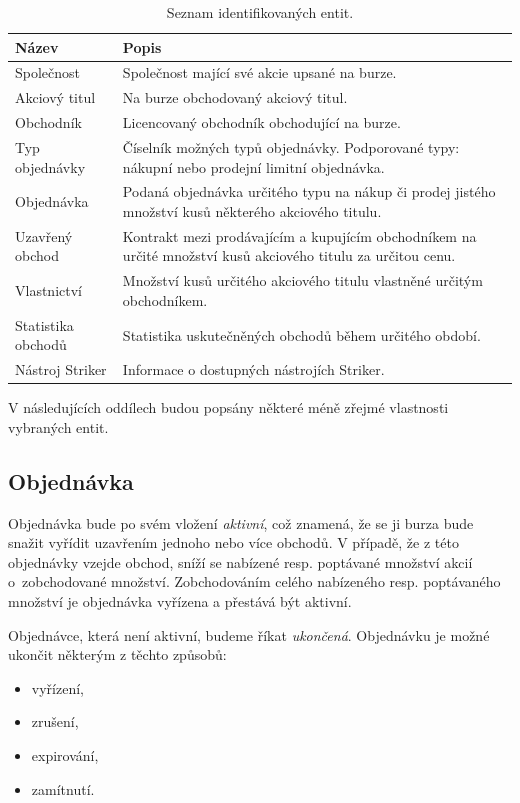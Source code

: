 \documentclass[thesis=M,czech]{FITthesis}[2012/06/26]
\begin{document}
\begin{table}\centering
	\begin{tabular}{| l | p{9cm} |}\hline
		Název	 		& Popis								\tabularnewline \hline \hline
		Společnost		& Společnost mající své akcie upsané na burze.		\tabularnewline \hline
		Akciový titul		& Na burze obchodovaný akciový titul.				\tabularnewline \hline
		Obchodník		& Licencovaný obchodník obchodující na burze.		\tabularnewline \hline
		Typ objednávky	& Číselník možných typů objednávky. Podporované typy: nákupní nebo prodejní limitní objednávka.			\tabularnewline \hline
		Objednávka		& Podaná objednávka určitého typu na nákup či prodej jistého množství kusů některého akciového titulu.		\tabularnewline \hline
		Uzavřený obchod	& Kontrakt mezi prodávajícím a kupujícím obchodníkem na určité množství kusů akciového titulu za určitou cenu.	\tabularnewline \hline
		Vlastnictví		& Množství kusů určitého akciového titulu vlastněné určitým obchodníkem.						\tabularnewline \hline
		Statistika obchodů	& Statistika uskutečněných obchodů během určitého období.								\tabularnewline \hline
		Nástroj Striker	& Informace o dostupných nástrojích Striker.											\tabularnewline \hline
	\end{tabular}
	\caption[Seznam identifikovaných entit.]{Seznam identifikovaných entit.}
	\label{tab:entities}
\end{table}



V následujících oddílech budou popsány některé méně zřejmé vlastnosti vybraných entit.


\subsection{Objednávka}

Objednávka bude po svém vložení \textit{aktivní}, což znamená, že se ji burza bude snažit vyřídit uzavřením jednoho nebo více obchodů. 
V případě, že z této objednávky vzejde obchod, sníží se nabízené resp. poptávané množství akcií o~zobchodované množství. Zobchodováním 
celého nabízeného resp. poptávaného množství je objednávka vyřízena a přestává být aktivní.

Objednávce, která není aktivní, budeme říkat \textit{ukončená}. Objednávku je možné ukončit některým z těchto způsobů:

\begin{itemize}
	\item vyřízení, 
	\item zrušení, 
	\item expirování, 
	\item zamítnutí.
\end{itemize}
\end{document}
